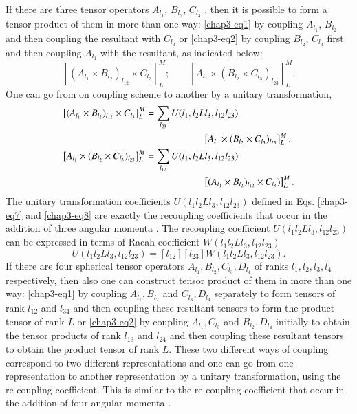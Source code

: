 If there are three tensor operators $A_{l_1}$, $B_{l_2}$, $C_{l_3}$ , then it is possible to form a tensor product of them in more than one way: \eqref{chap3-eq1} by coupling $A_{l_1}$, $B_{l_2}$ and then coupling the resultant with $C_{l_3}$ or \eqref{chap3-eq2} by coupling $B_{l_2}$, $C_{l_3}$ first and then coupling $A_{l_1}$ with the resultant, as indicated below:
\begin{equation}
\left[ (A_{l_1} \times B_{l_2})_{l_{12}} \times C_{l_3}\right]^M_L;  \qquad \left[ A_{l_1} \times (B_{l_2} \times C_{l_3})_{l_{23}}\right]^M_L. \label{chap3-eq6}
\end{equation}
One can go from on coupling scheme to another by a unitary transformation,
\begin{align}
\left[ (A_{l_1} \times B_{l_2})_{l_{12}} \times C_{l_3}\right]^M_L  & = \sum_{l_{23}} U (l_1, l_2 L l_3, l_{12} l_{23})\notag \\ 
& \qquad \qquad \qquad \left[A_{l_1} \times (B_{l_2} \times C_{l_3})_{l_{23}} \right]^M_L. \label{chap3-eq7}\\ 
\left[ A_{l_1} \times (B_{l_2} \times C_{l_3})_{l_{23}}\right]^M_L & = \sum_{l_{12}} U (l_1, l_2 L l_3, l_{12} l_{23}) \notag \\
& \qquad \qquad \qquad \left[(A_{l_1} \times B_{l_2})_{l_{12}} \times C_{l_3}) \right]^M_L. \label{chap3-eq8} 
\end{align}
The unitary transformation coefficients $U (l_1 l_2 L l_3, l_{12} l_{23})$ defined in Eqs. \eqref{chap3-eq7} and \eqref{chap3-eq8} are exactly the recoupling coefficients that occur in the addition of three angular momenta \cite{chap3-key11,chap3-key12}. The recoupling coefficient $U (l_1 l_2 Ll_3 , l_{12} l_{23})$ can be expressed in terms of Racah coefficient $W (l_1 l_2 Ll_3 , l_{12} l_{23})$ 
\begin{equation}
U (l_1 l_2 Ll_3 , l_{12} l_{23}) = [l_{12}][l_{23}] W (l_{1} l_2 Ll_3 , l_{12} l_{23}). \label{chap3-eq9}
\end{equation}
If there are four spherical tensor operators $A_{l_1}, B_{l_2}, C_{l_3}, D_{l_4}$ of ranks $l_1, l_2, l_3, l_4$ respectively, then also one can construct tensor product of them in more than one way: \eqref{chap3-eq1} by coupling $A_{l_1}, B_{l_2}$ and $C_{l_3}, D_{l_4}$ separately to form tensors of rank $l_{12}$ and $l_{34}$ and then coupling these resultant tensors to form the product tensor of rank $L$ or \eqref{chap3-eq2} by coupling $A_{l_1}, C_{l_3}$ and $B_{l_2}, D_{l_4}$ initially to obtain the tensor products of rank $l_{13}$ and $l_{24}$ and then coupling these resultant tensors to obtain the product tensor of rank $L$. These two different ways of coupling correspond to two different representations and one can go from one representation to another representation by a unitary transformation, using the re-coupling coefficient. This is similar to the re-coupling coefficient that occur in the addition of four angular momenta \cite{chap3-key11,chap3-key12}.

